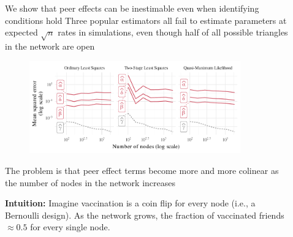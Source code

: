 \documentclass[final]{beamer}
\newlength{\sepwidth}
\newlength{\colwidth}
\newcommand{\separatorcolumn}{\begin{column}{\sepwidth}\end{column}}
\begin{document}
\begin{frame}[t]
\begin{columns}[t]
\begin{column}{\colwidth}
        \end{column}

        \separatorcolumn

        \begin{column}{\colwidth}


            \begin{block}{We show that peer effects can be inestimable even when identifying conditions hold}
                Three popular estimators all fail to estimate parameters at expected $\sqrt{n}$ rates in simulations, even though half of all possible triangles in the network are open
                \begin{figure}
                    \centering
                    \includegraphics[width=0.9\textwidth]{./figures/simulations/biometrika-mse.pdf}
                \end{figure}
            \end{block}

            \begin{block}{The problem is that peer effect terms become more and more colinear as the number of nodes in the network increases}

                \textbf{Intuition:} Imagine vaccination is a coin flip for every node (i.e., a Bernoulli design). As the network grows, the fraction of vaccinated friends $\approx 0.5$ for every single node.


\end{block}
\end{column}
\end{columns}
\end{frame}
\end{document}
